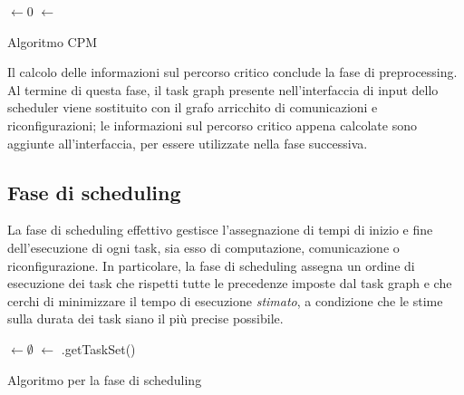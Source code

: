 \IncMargin{1em}
\begin{algorithm}
 
 \BlankLine
  $\leftarrow 0$\;
  $\leftarrow$ \;
 \caption{Algoritmo CPM}
\label{alg:CPM}
\end{algorithm}
\DecMargin{1em}

Il calcolo delle informazioni sul percorso critico conclude la fase di 
preprocessing. Al termine di questa fase, il task graph presente 
nell'interfaccia di input dello scheduler viene sostituito con il grafo 
arricchito di comunicazioni e riconfigurazioni; le informazioni sul percorso 
critico appena calcolate sono aggiunte all'interfaccia, per essere utilizzate 
nella fase successiva.


\subsection{Fase di scheduling}
\label{subsec:faseScheduling}
La fase di scheduling effettivo gestisce l'assegnazione di tempi di inizio e 
fine dell'esecuzione di ogni task, sia esso di computazione, comunicazione o 
riconfigurazione. In particolare, la fase di scheduling assegna un ordine di 
esecuzione dei task che rispetti tutte le precedenze imposte dal task graph e 
che cerchi di minimizzare il tempo di esecuzione \emph{stimato}, a condizione
che le stime sulla durata dei task siano il più precise possibile.

\IncMargin{1em}
\begin{algorithm}
 
 \BlankLine
 \SchedulerOutput $\leftarrow \emptyset$\;
 \UnscheduledSet $\leftarrow$ \SchedulerInput.getTaskSet()\;
 \Return{\SchedulerOutput}
\caption{Algoritmo per la fase di scheduling}
\label{alg:faseScheduling}
\end{algorithm}
\DecMargin{1em}

